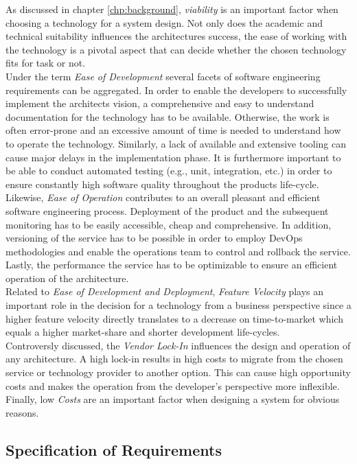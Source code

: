 As discussed in chapter \ref{chp:background}, \textit{viability} is an important factor when choosing a technology for a system design. Not only does the academic and technical suitability influences the architectures success, the ease of working with the technology is a pivotal aspect that can decide whether the chosen technology fits for task or not.\\
Under the term \textit{Ease of Development} several facets of software engineering requirements can be aggregated. In order to enable the developers to successfully implement the architects vision, a comprehensive and easy to understand documentation for the technology has to be available. Otherwise, the work is often error-prone and an excessive amount of time is needed to understand how to operate the technology. Similarly, a lack of available and extensive tooling can cause major delays in the implementation phase. It is furthermore important to be able to conduct automated testing (e.g., unit, integration, etc.) in order to ensure constantly high software quality throughout the products life-cycle.\\
Likewise, \textit{Ease of Operation} contributes to an overall pleasant and efficient software engineering process. Deployment of the product and the subsequent monitoring has to be easily accessible, cheap and comprehensive. In addition, versioning of the service has to be possible in order to employ DevOps methodologies and enable the operations team to control and rollback the service. Lastly, the performance the service has to be optimizable to ensure an efficient operation of the architecture.\\
Related to \textit{Ease of Development and Deployment}, \textit{Feature Velocity} plays an important role in the decision for a technology from a business perspective since a higher feature velocity directly translates to a decrease on time-to-market which equals a higher market-share and shorter development life-cycles.\\
Controversly discussed, the \textit{Vendor Lock-In} influences the design and operation of any architecture. A high lock-in results in high costs to migrate from the chosen service or technology provider to another option. This can cause high opportunity costs and makes the operation from the developer's perspective more inflexible. \\
Finally, low \textit{Costs} are an important factor when designing a system for obvious reasons. 

\subsection{Specification of Requirements}

